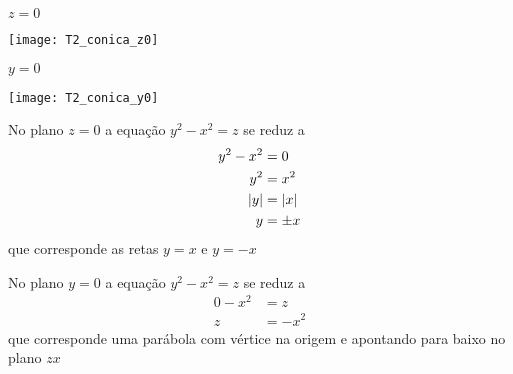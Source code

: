 \documentclass[a4paper,12pt,fleqn]{article}
\begin{document}
\begin{answer}
  \begin{multicols}{2}
    \(z=0\)
    \vspace{-0.8\baselineskip}
    \begin{center}
      \texttt{[image: T2\_conica\_z0]}
    \end{center}
    \(y=0\)
    \vspace{-0.8\baselineskip}
    \begin{center}
      \texttt{[image: T2\_conica\_y0]}
    \end{center}
  \end{multicols}

  No plano \(z=0\) a equação \(y^2-x^2=z\) se reduz a
  \begin{align*}
    y^2-x^2 & = 0       \\
    y^2     & = x^2     \\
    \abs{y} & = \abs{x} \\
    y       & = \pm x
  \end{align*}
  que corresponde as retas \(y=x\) e \(y=-x\)

  No plano \(y=0\) a equação \(y^2-x^2=z\) se reduz a
  \begin{align*}
    0-x^2 & = z    \\
    z     & = -x^2
  \end{align*}
  que corresponde uma parábola com vértice na origem e apontando para baixo
  no plano $zx$
\end{answer}

\end{document}
